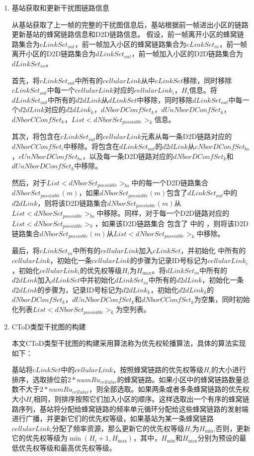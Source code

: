 \documentclass[figurelist,tablelist,algorithmlist,nomlist,masters]{seuthesix}
\begin{document}
	\begin{enumerate}
	\item 基站获取和更新干扰图链路信息
	
	从基站获取了上一帧的完整的干扰图信息后，基站根据前一帧进出小区的链路更新基站的蜂窝链路信息和D2D链路信息。
	假设，前一帧离开小区的蜂窝链路集合为$cLinkSe{t_{out}}$，前一帧加入小区的蜂窝链路集合为$cLinkSe{t_{in}}$，前一帧离开小区的D2D链路集合为$dLinkSe{t_{out}}$，前一帧加入小区的D2D链路集合为$dLinkSe{t_{in}}$。
	
	首先，将$cLinkSe{t_{out}}$中所有的$cellularLink$从中$cLinkSet$移除，同时移除$cLinkSe{t_{out}}$中每一个$cellularLink$对应的$cellularLin{k_i}$，${H_i}$信息。将$dLinkSe{t_{out}}$中所有的$d2dLink$从$dLinkSet$中移除，同时移除$dLinkSe{t_{out}}$中每一个$d2dLink$对应的$d2dLin{k_k}$，$dNborDConfSe{t_k}$，$dUnNborDConfSe{t_k}$，$dNborCConfSe{t_k}$，$List < dNborSe{t_{possiable}}{ > _k}$信息。
	
	其次，将包含在$cLinkSe{t_{out}}$的$cellularLink$元素从每一条D2D链路对应的$dNborCConfSe{t_i}$中移除。将包含在$dLinkSe{t_{out}}$的$d2dLink$从$cNborDConfSe{t_{bs}}$，$cUnNborDConfSe{t_{bs}}$，以及每一条D2D链路对应的$dNborDConfSe{t_k}$和$dUnNborDConfSe{t_k}$中移除。
	
	然后，对于$List < dNborSe{t_{possiable}}{ > _{bs}}$中的每一个D2D链路集合$dNborSe{t_{possiable}}(m)$，如果$dNborSe{t_{possiable}}(m)$包含了$dLinkSe{t_{out}}$中的$d2dLink$，则将该D2D链路集合$dNborSe{t_{possiable}}(m)$从$List < dNborSe{t_{possiable}}{ > _{bs}}$中移除。同样，对于每一个D2D链路对应的$List < dNborSe{t_{possiable}}{ > _k}$，如果该D2D链路集合 包含了 中的 ，则将该D2D链路集合$dNborSe{t_{possiable}}(m)$从$List < dNborSe{t_{possiable}}{ > _k}$中移除。
	
	最后，将$cLinkSe{t_{in}}$中所有的$cellularLink$加入$cLinkSet$，并初始化 中所有的$cellularLink$，初始化一条$cellularLink$的步骤为记录ID号标记为$cellularLin{k_i}$，初始化$cellularLin{k_i}$的优先权等级${H_i}$为${H_{\max }}$。将$dLinkSe{t_{in}}$中所有的$d2dLink$加入$dLinkSet$中并初始化$dLinkSe{t_{in}}$中所有的$d2dLink$，初始化一条$d2dLink$的步骤为，记录ID号标记为$d2dLin{k_k}$，初始化$d2dLin{k_k}$的$dNborDConfSe{t_k}$，$dUnNborDConfSe{t_k}$和$dNborCConfSe{t_k}$为空集，同时初始化列表$List < dNborSe{t_{possiable}}{ > _k}$为空列表。
	
	\item CToD类型干扰图的构建
	
	本文CToD类型干扰图的构建采用算法称为优先权轮播算法，具体的算法实现如下：
	
	基站将$cLinkSet$中的$cellularLink$，按照蜂窝链路的优先权等级${H_i}$的大小进行排序，选取排位前$2*numR{u_{cellular}}$的蜂窝链路。如果小区中的蜂窝链路数量总数不大于$2*numR{u_{cellular}}$，则全部选取。如果两条或者多条蜂窝链路的优先权大小${H_i}$相同，则排序按照它们加入小区的顺序。这样选取出一个有序的蜂窝链路序列，基站将分配给蜂窝链路的频率单元循环分配给这些蜂窝链路的发射端进行广播，并更新它们的优先权等级，如果基站为某一条蜂窝链路$cellularLin{k_i}$分配了频率资源，那么更新它的优先权等级${H_i}$为${H_{\min }}$,否则，更新它的优先权等级为$\min ({H_i} + 1,{H_{\max }})$，其中，${H_{\min }}$和${H_{\max }}$分别为预设的最低优先权等级和最高优先权等级。
	

\end{enumerate}
\end{document}
